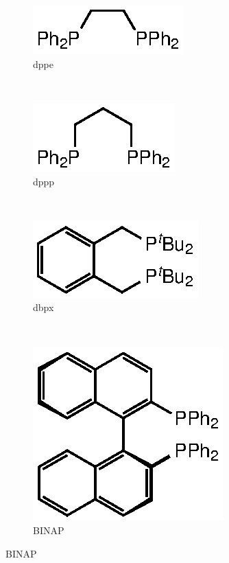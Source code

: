 \begin{figure}[htbp]
\centering
\begin{subfigure}[b]{0.3\textwidth}
	\centering
	\includegraphics{../Figures/Diphosphines/dppe.eps}
	\caption{dppe}
	\label{dppe}
\end{subfigure}
~
\begin{subfigure}[b]{0.3\textwidth}
	\centering
	\includegraphics{../Figures/Diphosphines/dppp.eps}
	\caption{dppp}
	\label{dppp}
\end{subfigure}
~
\begin{subfigure}[b]{0.3\textwidth}
	\centering
	\includegraphics{../Figures/Diphosphines/dbpx.eps}
	\caption{dbpx}
	\label{dbpx}
\end{subfigure}
\\
\vspace{0.5cm}
\begin{subfigure}[b]{0.3\textwidth}
	\centering
	\includegraphics{../Figures/Diphosphines/BINAP.eps}
	\caption{BINAP}
	\label{BINAP}
\end{subfigure}

\end{figure}
